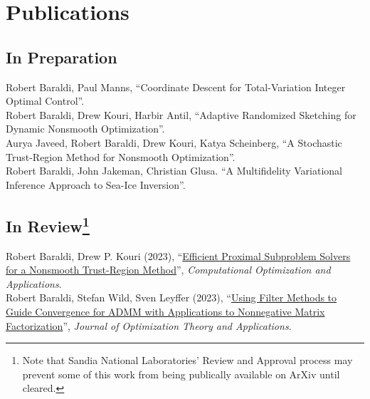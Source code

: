 \documentclass[12pt, a4paper]{article}
\newcommand{\years}[1]{\marginnote{#1}}
\begin{document}
\section*{Publications}
\subsection*{In Preparation}
\years{2023-} Robert Baraldi, Paul Manns, ``Coordinate Descent for Total-Variation Integer Optimal Control''. \\
\years{2023-} Robert Baraldi, Drew Kouri, Harbir Antil, ``Adaptive Randomized Sketching for Dynamic Nonsmooth Optimization''. \\
\years{2023-} Aurya Javeed, Robert Baraldi, Drew Kouri, Katya Scheinberg, ``A Stochastic Trust-Region Method for Nonsmooth Optimization''.\\
\years{2023-} Robert Baraldi, John Jakeman, Christian Glusa. ``A Multifidelity Variational Inference Approach to Sea-Ice Inversion''.

\subsection*{In Review\footnote{\tiny Note that Sandia National Laboratories' Review and Approval process may prevent some of this work from being publically available on ArXiv until cleared. }}
\years{2023} Robert Baraldi, Drew P. Kouri (2023), ``\href{https://optimization-online.org/2023/11/efficient-proximal-subproblem-solvers-for-a-nonsmooth-trust-region-method/}{Efficient Proximal Subproblem Solvers for a Nonsmooth Trust-Region Method}'', \emph{Computational Optimization and Applications}. \\
\years{2023} Robert Baraldi, Stefan Wild, Sven Leyffer (2023), ``\href{https://optimization-online.org/2024/02/using-filter-methods-to-guide-convergence-for-admm-with-applications-to-nonnegative-matrix-factorization-problems/}{Using Filter Methods to Guide Convergence for ADMM with Applications to Nonnegative Matrix Factorization}'', \emph{Journal of Optimization Theory and Applications}.\\
\end{document}
